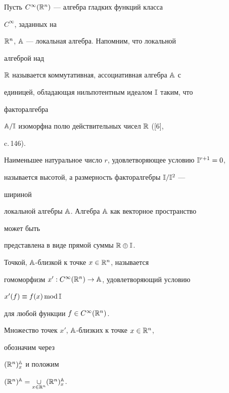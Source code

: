  


Пусть $C^\infty(\Bbb R^n)$ --- алгебра гладких функций класса 


$C^\infty$, заданных на  


$\Bbb R^n$, $\Bbb A$ --- локальная алгебра. Напомним, что локальной 


алгеброй над 


$\Bbb R$ называется коммутативная, ассоциативная алгебра $\Bbb A$ с 


единицей, обладающая нильпотентным идеалом $\Bbb I$ таким, что 


факторалгебра 


$\Bbb A/\Bbb I$ изоморфна полю действительных чисел $\Bbb R$ ([6], 


c.\,146). 


 


Наименьшее натуральное число $r$, удовлетворяющее условию $\Bbb 


I^{r+1}=0$, 


называется высотой, а размерность факторалгебры $\Bbb I/\Bbb I^2$ --- 


шириной 


локальной алгебры $\Bbb A$. Алгебра $\Bbb A$ как векторное пространство 


может быть  


представлена в виде прямой суммы $\Bbb R\oplus\Bbb I$. 


 


\begin{defns} Точкой, $\Bbb 


A$-близкой к точке $x\in\Bbb R^n$, называется  


гомоморфизм $x':C^\infty(\Bbb R^n)\to\Bbb A$, удовлетворяющий условию 


$x'(f)\equiv f(x)\operatorname{mod}\Bbb I$ 


для любой функции $f\in C^\infty(\Bbb R^n)$. 


\end{defns} 


 


Множество точек $x'$, $\Bbb A$-близких к точке $x\in\Bbb R^n$, 


обозначим через  


$(\Bbb R^n)^{\Bbb A}_x$ и положим 


$(\Bbb R^n)^{\Bbb A}=\mathop{\cup}\limits_{x\in\Bbb R^n}(\Bbb R^n)^{\Bbb A}_x$. 


